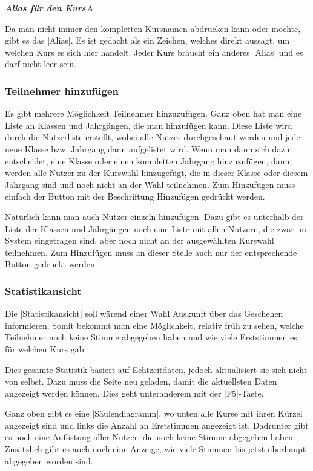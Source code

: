 \documentclass[ngerman]{ltxdoc}
\newcommand{\DescribeOption}[4]{
  \DescribeMacro{#1}
  \begin{minipage}[t]{\textwidth}
    \textit{\textbf{\textcolor{mLightGreen}{#2}}}\dotfill\,#3\par
    \begingroup
    \vspace{0.5em}#4\par
    \endgroup
  \end{minipage}
}
\begin{document}
\DescribeOption{Alias}{Alias für den Kurs}{A}{
  Da man nicht immer den kompletten Kursnamen abdrucken kann oder möchte, gibt es
  das |Alias|. Es ist gedacht als ein Zeichen, welches direkt aussagt, um welchen
  Kurs es sich hier handelt. Jeder Kurs braucht ein anderes |Alias| und es darf
  nicht leer sein.
}

\subsubsection{Teilnehmer hinzufügen}

Es gibt mehrere Möglichkeit Teilnehmer hinzuzufügen. Ganz oben hat man eine Liste
an Klassen und Jahrgängen, die man hinzufügen kann. Diese Liste wird durch die
Nutzerliste erstellt, wobei alle Nutzer durchgeschaut werden und jede neue Klasse
bzw. Jahrgang dann aufgelistet wird. Wenn man dann sich dazu entscheidet, eine Klasse
oder einen kompletten Jahrgang hinzuzufügen, dann werden alle Nutzer zu der Kurswahl
hinzugefügt, die in dieser Klasse oder diesem Jahrgang sind und noch nicht an der Wahl
teilnehmen. Zum Hinzufügen muss einfach der Button mit der Beschriftung \glqq Hinzufügen\grqq{}
gedrückt werden.

Natürlich kann man auch Nutzer einzeln hinzufügen. Dazu gibt es unterhalb der Liste
der Klassen und Jahrgängen noch eine Liste mit allen Nutzern, die zwar im System
eingetragen sind, aber noch nicht an der ausgewählten Kurswahl teilnehmen. Zum Hinzufügen
muss an dieser Stelle auch nur der entsprechende Button gedrückt werden.

\subsubsection{Statistikansicht}

Die |Statistikansicht| soll wärend einer Wahl Auskunft über das Geschehen informieren.
Somit bekommt man eine Möglichkeit, relativ früh zu sehen, welche Teilnehmer noch
keine Stimme abgegeben haben und wie viele Erststimmen es für welchen Kurs gab.

Dies gesamte Statistik basiert auf Echtzeitdaten, jedoch aktualisiert sie sich
nicht von selbst. Dazu muss die Seite neu geladen, damit die aktuellsten Daten
angezeigt werden können. Dies geht unteranderem mit der |F5|-Taste.

Ganz oben gibt es eine |Säulendiagramm|, wo unten alle Kurse mit ihren Kürzel
angezeigt sind und links die Anzahl an Erststimmen angezeigt ist. Dadrunter gibt
es noch eine Auflistung aller Nutzer, die noch keine Stimme abgegeben haben. Zusätzlich
gibt es auch noch eine Anzeige, wie viele Stimmen bis jetzt überhaupt abgegeben worden
sind.
\end{document}
